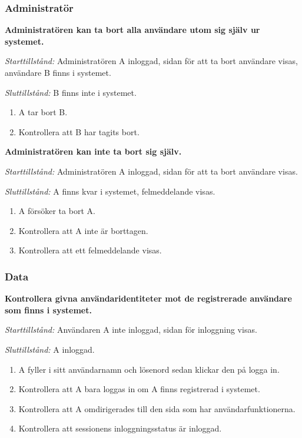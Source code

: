 \documentclass[a4paper]{article}
\begin{document}
\subsubsection{Administratör}
\begin{FT}
\item
\textbf{Administratören kan ta bort alla användare utom sig själv ur systemet.}

\emph{Starttillstånd:} Administratören A inloggad, sidan för att ta bort användare visas, användare B finns i systemet.

\emph{Sluttillstånd:} B finns inte i systemet.

\begin{enumerate}
\item A tar bort B.
\item Kontrollera att B har tagits bort.

\end{enumerate}

\item
\textbf{Administratören kan inte ta bort sig själv.}

\emph{Starttillstånd:} Administratören A inloggad, sidan för att ta bort användare visas.

\emph{Sluttillstånd:} A finns kvar i systemet, felmeddelande visas.

\begin{enumerate}
\item A försöker ta bort A.
\item Kontrollera att A inte är borttagen.
\item Kontrollera att ett felmeddelande visas.
\end{enumerate}

\end{FT}

\subsubsection{Data}
\begin{FT}
\item
\textbf{Kontrollera givna användaridentiteter mot de registrerade användare som finns i systemet.}

\emph{Starttillstånd:} Användaren A inte inloggad, sidan för inloggning visas.

\emph{Sluttillstånd:} A inloggad.

\begin{enumerate}
\item A fyller i sitt användarnamn och lösenord sedan klickar den på logga in.
\item Kontrollera att A bara loggas in om A finns registrerad i systemet.
\item Kontrollera att A omdirigerades till den sida som har användarfunktionerna.
\item Kontrollera att sessionens inloggningsstatus är inloggad.
\end{enumerate}
\end{FT}
\end{document}
